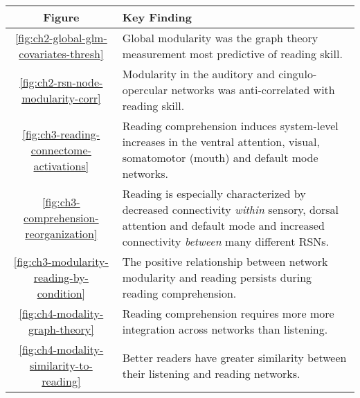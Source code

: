 \begin{tabular}{c|p{10cm}}
\toprule 
Figure & Key Finding \\ 
\midrule 
\ref{fig:ch2-global-glm-covariates-thresh} & Global modularity was the graph theory measurement most predictive of reading skill. \\ 
 \ref{fig:ch2-rsn-node-modularity-corr} & Modularity in the auditory and cingulo-opercular networks was anti-correlated with reading skill.	\\ 
\ref{fig:ch3-reading-connectome-activations} & Reading comprehension induces system-level increases in the ventral attention, visual, somatomotor (mouth) and default mode networks.	 \\ 
\ref{fig:ch3-comprehension-reorganization}  & Reading is especially characterized by decreased connectivity \textit{within} sensory, dorsal attention and default mode and increased connectivity \textit{between} many different RSNs.  \\ 
\ref{fig:ch3-modularity-reading-by-condition}  & The positive relationship between network modularity and reading persists during reading comprehension.  \\ 
\ref{fig:ch4-modality-graph-theory}  & Reading comprehension requires more more integration across networks than listening. \\ 
\ref{fig:ch4-modality-similarity-to-reading} & Better readers have greater similarity between their listening and reading networks.\\
\bottomrule 
\end{tabular}